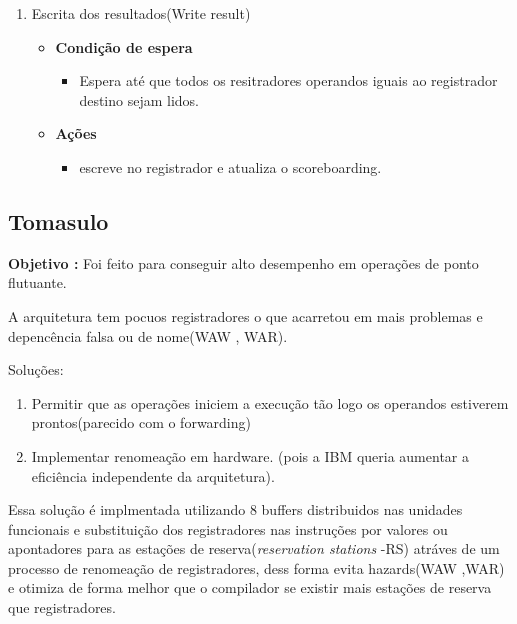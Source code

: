 \documentclass[a4paper]{article}
\begin{document}
\begin{enumerate}
\begin{itemize}
        \end{itemize}
    \item Escrita dos resultados(Write result)
        \begin{itemize}
            \item  \textbf{Condição de espera}
                \begin{itemize}
                    \item Espera até que todos os resitradores operandos iguais ao registrador
                        destino sejam lidos.
                \end{itemize}
            \item \textbf{Ações}
                \begin{itemize}
                    \item escreve no registrador e atualiza o scoreboarding.
                \end{itemize}
        \end{itemize}

\end{enumerate}

\subsection{Tomasulo}
\textbf{Objetivo :} Foi feito para conseguir alto desempenho em operações de ponto flutuante.

A arquitetura tem pocuos registradores o que acarretou em mais problemas e depencência falsa ou de nome(WAW , WAR).

Soluções:
\begin{enumerate}
    \item Permitir que as operações iniciem a execução tão logo os operandos estiverem prontos(parecido com o
        forwarding)
    \item Implementar renomeação em hardware. (pois  a IBM queria aumentar a eficiência independente da arquitetura).
\end{enumerate}

Essa solução é implmentada utilizando 8 buffers distribuidos nas unidades funcionais e substituição dos registradores
nas instruções por valores ou apontadores para as estações de reserva(\textit{reservation stations} -RS) atráves de um
processo de renomeação de registradores, dess forma evita hazards(WAW ,WAR) e otimiza de forma melhor que o compilador
se existir mais estações de reserva que registradores.
\end{document}
